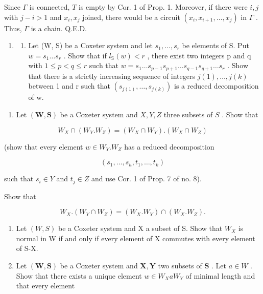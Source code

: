 Since \(\Gamma\) is connected, \(T\) is empty by Cor. 1 of Prop. 1. Moreover, if there were \(i,j\) with \(j - i > 1\) and \(x_{i}, x_{j}\) joined, there would be a circuit \((x_{i}, x_{i+1}, \ldots, x_{j})\) in \(\Gamma\) . Thus, \(\Gamma\) is a chain. Q.E.D.


\begin{enumerate}
\def\labelenumi{\arabic{enumi})}
\tightlist
\item
  \begin{enumerate}
  \def\labelenumii{\alph{enumii})}
  \tightlist
  \item
    Let (W, S) be a Coxeter system and let \(s_{1}, \ldots, s_{r}\) be elements of S. Put \(w = s_{1} \ldots s_{r}\) . Show that if \(l_{\mathbb{S}}(w) < r\) , there exist two integers p and q with \(1 \leqslant p < q \leqslant r\) such that \(w = s_{1} \ldots s_{p-1}s_{p+1} \ldots s_{q-1}s_{q+1} \ldots s_{r}\) . Show that there is a strictly increasing sequence of integers \(j(1), \ldots, j(k)\) between 1 and r such that \((s_{j(1)}, \ldots, s_{j(k)})\) is a reduced decomposition of w.
  \end{enumerate}
\end{enumerate}

\begin{enumerate}
\def\labelenumi{\alph{enumi})}
\setcounter{enumi}{1}
\tightlist
\item
  Let \((\mathbf{W},\mathbf{S})\) be a Coxeter system and \(X,Y,Z\) three subsets of \(S\) . Show that
\end{enumerate}

\[
W _ {X} \cap (W _ {Y}. W _ {Z}) = (W _ {X} \cap W _ {Y}). (W _ {X} \cap W _ {Z})
\]

(show that every element \(w \in W_{Y}.W_{Z}\) has a reduced decomposition

\[
(s _ {1}, \ldots , s _ {h}, t _ {1}, \ldots , t _ {k})
\]

such that \(s_i \in Y\) and \(t_j \in Z\) and use Cor. 1 of Prop. 7 of no. 8).

Show that

\[
W _ {X}. \left(W _ {Y} \cap W _ {Z}\right) = \left(W _ {X}. W _ {Y}\right) \cap \left(W _ {X}. W _ {Z}\right).
\]

\begin{enumerate}
\def\labelenumi{\arabic{enumi})}
\setcounter{enumi}{1}
\item
  Let \((W,S)\) be a Coxeter system and X a subset of S. Show that \(W_{X}\) is normal in W if and only if every element of X commutes with every element of S-X.
\item
  Let \((\mathbf{W},\mathbf{S})\) be a Coxeter system and \(\mathbf{X},\mathbf{Y}\) two subsets of \(\mathbf{S}\) . Let \(a\in W\) . Show that there exists a unique element \(w\in W_X a W_Y\) of minimal length and that every element
\end{enumerate}

